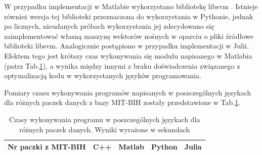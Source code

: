 W przypadku implementacji w Matlabie wykorzystano bibliotekę libsvm \cite{csie}. Istnieje również wersja tej biblioteki przeznaczona do wykorzystania w Pythonie, jednak po licznych, nieudanych próbach wykorzystania jej zdecydowano się zaimplementować własną maszynę wektorów nośnych w oparciu o pliki źródłowe biblioteki libsvm. Analogicznie postąpiono w przypadku implementacji w Julii. Efektem tego jest krótszy czas wykonywania się modułu napisanego w Matlabia (patrz Tab.\ref{tabResults}), a wynika między innymi z braku doświadczenia związanego z optymalizacją kodu w wykorzystanych języków programowania.

Pomiary czasu wykonywania programów napisanych w poszczególnych językach dla różnych paczek danych z bazy MIT-BIH zostały przedstawione w Tab.\ref{tabResults}.

\begin{table}[!tp]
	\centering
	\caption{Czasy wykonywania programu w poszczególnych językach dla różnych paczek danych. Wyniki wyrażone w sekundach}
	\label{tabResults}
	\begin{tabular}{|c|c|c|c|c|}
		\hline
		Nr paczki z MIT-BIH & C++ & Matlab & Python & Julia\\ \hline		
		

\end{tabular}
\end{table}

